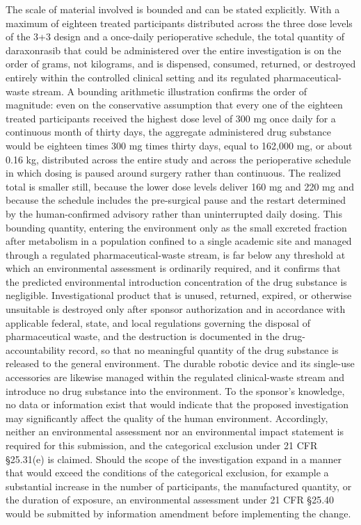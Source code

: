 The scale of material involved is bounded and can be stated explicitly. With a
maximum of eighteen treated participants distributed across the three dose levels
of the 3+3 design and a once-daily perioperative schedule, the total quantity of
daraxonrasib that could be administered over the entire investigation is on the
order of grams, not kilograms, and is dispensed, consumed, returned, or destroyed
entirely within the controlled clinical setting and its regulated
pharmaceutical-waste stream. A bounding arithmetic illustration confirms the
order of magnitude: even on the conservative assumption that every one of the
eighteen treated participants received the highest dose level of 300 mg once daily
for a continuous month of thirty days, the aggregate administered drug substance
would be eighteen times 300 mg times thirty days, equal to 162,000 mg, or about
0.16 kg, distributed across the entire study and across the perioperative schedule
in which dosing is paused around surgery rather than continuous. The realized
total is smaller still, because the lower dose levels deliver 160 mg and 220 mg
and because the schedule includes the pre-surgical pause and the restart
determined by the human-confirmed advisory rather than uninterrupted daily dosing.
This bounding quantity, entering the environment only as the small excreted
fraction after metabolism in a population confined to a single academic site and
managed through a regulated pharmaceutical-waste stream, is far below any
threshold at which an environmental assessment is ordinarily required, and it
confirms that the predicted environmental introduction concentration of the drug
substance is negligible. Investigational product that is unused, returned,
expired, or otherwise unsuitable is destroyed only after sponsor authorization
and in accordance with applicable federal, state, and local regulations governing
the disposal of pharmaceutical waste, and the destruction is documented in the
drug-accountability record, so that no meaningful quantity of the drug substance
is released to the general environment. The durable robotic device and its
single-use accessories are likewise managed within the regulated clinical-waste
stream and introduce no drug substance into the environment. To the sponsor's
knowledge, no data or information exist that would indicate that the proposed
investigation may significantly affect the quality of the human environment.
Accordingly, neither an environmental assessment nor an environmental impact
statement is required for this submission, and the categorical exclusion under 21
CFR \S 25.31(e) is claimed. Should the scope of the investigation expand in a
manner that would exceed the conditions of the categorical exclusion, for example
a substantial increase in the number of participants, the manufactured quantity,
or the duration of exposure, an environmental assessment under 21 CFR \S 25.40
would be submitted by information amendment before implementing the change.
